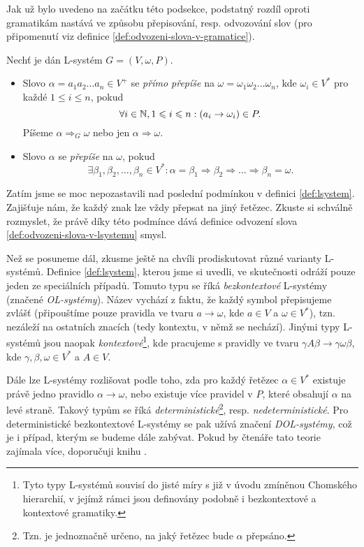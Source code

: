Jak už bylo uvedeno na začátku této podsekce, podstatný rozdíl oproti gramatikám nastává ve způsobu přepisování, resp. odvozování slov (pro připomenutí viz definice \ref{def:odvozeni-slova-v-gramatice}).
\begin{definition}\label{def:odvozeni-slova-v-lsystemu}
    Nechť je dán L-systém $G=(V,\omega,P)$.
    \begin{itemize}
        \item Slovo $\alpha=a_1a_2\ldots a_n\in V^+$ se \emph{přímo přepíše} na $\omega=\omega_1\omega_2\ldots\omega_n$, kde $\omega_i\in V^*$ pro každé $1\leqslant i\leqslant n$, pokud
        \[\forall i\in\mathbb{N},1\leqslant i\leqslant n: (a_i\to\omega_i)\in P.\]
        Píšeme $\alpha\Rightarrow_G\omega$ nebo jen $\alpha\Rightarrow\omega$.
        \item Slovo $\alpha$ se \emph{přepíše} na $\omega$, pokud
        \[\exists\beta_1,\beta_2,\ldots,\beta_n\in V^*:\alpha=\beta_1\Rightarrow\beta_2\Rightarrow\dots\Rightarrow\beta_n=\omega.\]
    \end{itemize}
\end{definition}
Zatím jsme se moc nepozastavili nad poslední podmínkou v definici \ref{def:lsystem}. Zajišťuje nám, že každý znak lze vždy přepsat na jiný řetězec. Zkuste si schválně rozmyslet, že právě díky této podmínce dává definice odvození slova \ref{def:odvozeni-slova-v-lsystemu} smysl.

Než se posuneme dál, zkusme ještě na chvíli prodiskutovat různé varianty L-systémů. Definice \ref{def:lsystem}, kterou jsme si uvedli, ve skutečnosti odráží pouze jeden ze speciálních případů. Tomuto typu se říká \emph{bezkontextové} L-systémy (značené \emph{OL-systémy}). Název vychází z faktu, že každý symbol přepisujeme zvlášť (připouštíme pouze pravidla ve tvaru $a\to\omega$, kde $a\in V$ a $\omega\in V^*$), tzn. nezáleží na ostatních znacích (tedy kontextu, v němž se nechází). Jinými typy L-systémů jsou naopak \emph{kontextové}\footnote{Tyto typy L-systémů souvisí do jisté míry s již v úvodu zmíněnou Chomského hierarchií, v jejímž rámci jsou definovány podobně i bezkontextové a kontextové gramatiky.}, kde pracujeme s pravidly ve tvaru $\gamma A\beta\to\gamma\omega\beta$, kde $\gamma,\beta,\omega\in V^*$ a $A\in V$.

Dále lze L-systémy rozlišovat podle toho, zda pro každý řetězec $\alpha\in V^*$ existuje právě jedno pravidlo $\alpha\to\omega$, nebo existuje více pravidel v $P$, které obsahují $\alpha$ na levé straně. Takový typům se říká \emph{deterministické}\footnote{Tzn. je jednoznačně určeno, na jaký řetězec bude $\alpha$ přepsáno.}, resp. \emph{nedeterministické}. Pro deterministické bezkontextové L-systémy se pak užívá značení \emph{DOL-systémy}, což je i případ, kterým se budeme dále zabývat. Pokud by čtenáře tato teorie zajímala více, doporučuji knihu \cite{Prusinkiewicz1990}.

